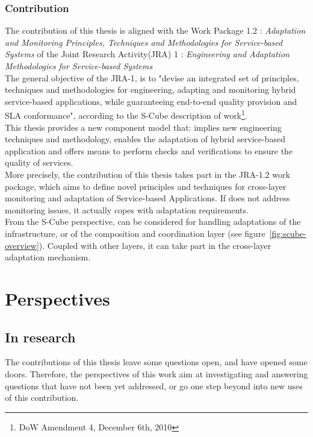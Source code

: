 \subsection{Contribution}

The contribution of this thesis is aligned with the Work Package 1.2 : {\it Adaptation and Monitoring Principles, Techniques and Methodologies for Service-based Systems} of the Joint Research Activity(JRA) 1 : {\it Engineering and Adaptation Methodologies for Service-based Systems}\\

The general objective of the JRA-1, is to "devise an integrated set of principles, techniques and methodologies for engineering, adapting and monitoring hybrid service-based applications, while guaranteeing end-to-end quality provision and SLA conformance", according to the S-Cube description of work\footnote{DoW Amendment 4, December 6th, 2010}.\\
This thesis provides a new component model that: implies new engineering techniques and methodology, enables the adaptation of hybrid service-based application and offers means to perform checks and verifications to ensure the quality of services.\\

More precisely, the contribution of this thesis takes part in the JRA-1.2 work package, which aims to define novel principles and techniques for cross-layer monitoring and adaptation of Service-based Applications. If \enti{} does not address monitoring issues, it actually copes with adaptation requirements.\\

From the S-Cube perspective, \enti{} can be considered for handling adaptations of the infrastructure, or of the composition and coordination layer (see figure~\ref{fig:scube-overview}). Coupled with other layers, it can take part in the cross-layer adaptation mechanism.






\chapter{Perspectives}
\section{In research}

The contributions of this thesis leave some questions open, and have opened some doors. Therefore, the perspectives of this work aim at investigating and answering questions that have not been yet addressed, or go one step beyond into new uses of this contribution.


